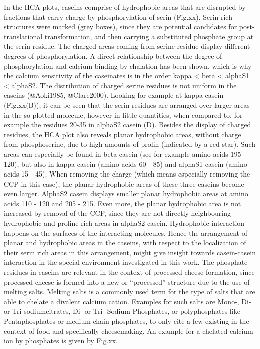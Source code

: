 \documentclass[
]{article}
\begin{document}
In the HCA plots, caseins comprise of hydrophobic areas that are
disrupted by fractions that carry charge by phosphorylation of serin
(Fig.xx). Serin rich structures were marked (grey boxes), since they are
potential candidates for post-translational transformation, and then
carrying a substituted phosphate group at the serin residue. The charged
areas coming from serine residue display different degrees of
phosphorylation. A direct relationship between the degree of
phosphorylation and calcium binding by chalation has been shown, which
is why the calcium sensitivity of the caseinates is in the order kappa
\textless{} beta \textless{} alphaS1 \textless{} alphaS2. The
distribution of charged serine residues is not uniform in the caseins
(@Aoki1985, @Clare2000). Looking for example at kappa casein
(Fig.xx(B)), it can be seen that the serin residues are arranged over
larger areas in the so plotted molecule, however in little quantities,
when compared to, for example the residues 20-35 in alphaS2 casein (D).
Besides the display of charged residues, the HCA plot also reveals
planar hydrophobic areas, without charge from phosphoserine, due to high
amounts of prolin (indicated by a red star). Such areas can especially
be found in beta casein (see for example amino acids 195 - 120), but
also in kappa casein (amino-acids 60 - 85) and alphaS1 casein (amino
acids 15 - 45). When removing the charge (which means especially
removing the CCP in this case), the planar hydrophobic areas of these
three caseins become even larger. AlphaS2 casein displays smaller planar
hydrophobic areas at amino acids 110 - 120 and 205 - 215. Even more, the
planar hydrophobic area is not increased by removal of the CCP, since
they are not directly neighbouring hydrophobic and proline rich areas in
alphaS2 casein. Hydrophobic interaction happens on the surfaces of the
interacting molecules. Hence the arrangement of planar and hydrophobic
areas in the caseins, with respect to the localization of their serin
rich areas in this arrangement, might give insight towards casein-casein
interaction in the special environment investigated in this work. The
phosphate residues in caseins are relevant in the context of processed
cheese formation, since processed cheese is formed into a new or
``processed'' structure due to the use of melting salts. Melting salts
is a commonly used term for the type of salts that are able to chelate a
divalent calcium cation. Examples for such salts are Mono-, Di- or
Tri-sodiumcitrates, Di- or Tri- Sodium Phosphates, or polyphosphates
like Pentaphosphates or medium chain phosphates, to only cite a few
existing in the context of food and specifically cheesemaking. An
example for a chelated calcium ion by phosphates is given by Fig.xx.
\end{document}
